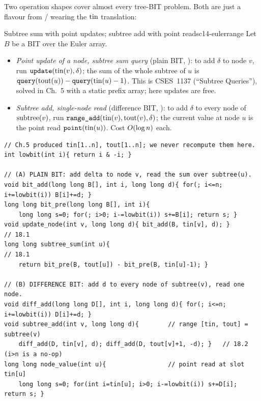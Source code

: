 Two operation shapes cover almost every tree-BIT problem.  Both are just a
flavour from / wearing the \(\operatorname{tin}\)
translation:

\begin{proposition}{Subtree sum with point updates; subtree add with point reads}{c14-eulerrange}
Let \(B\) be a BIT over the Euler array.
\begin{itemize}[nosep,leftmargin=1.4em]
  \item \emph{Point update of a node, subtree sum query} (plain BIT,
        ): to add \(\delta\) to node \(v\), run
        \(\texttt{update}(\operatorname{tin}(v),\delta)\); the sum of the whole subtree of
        \(u\) is \(\texttt{query}(\operatorname{tout}(u))-\texttt{query}(\operatorname{tin}(u)-1)\).
        This is CSES~1137 (``Subtree Queries''), solved in Ch.~5 with a static
        prefix array; here updates are free.
  \item \emph{Subtree add, single-node read} (difference BIT,
        ): to add \(\delta\) to every node of
        \(\operatorname{subtree}(v)\), run \(\texttt{range\_add}(\operatorname{tin}(v),\operatorname{tout}(v),\delta)\);
        the current value at node \(u\) is the point read
        \(\texttt{point}(\operatorname{tin}(u))\).  Cost \(O(\log n)\) each.
\end{itemize}
\end{proposition}

\begin{lstlisting}[caption={Euler-indexed BIT: subtree sum with point updates, and subtree add with point reads}, label={lst:c14-subtree}]
// Ch.5 produced tin[1..n], tout[1..n]; we never recompute them here.
int lowbit(int i){ return i & -i; }

// (A) PLAIN BIT: add delta to node v, read the sum over subtree(u).
void bit_add(long long B[], int i, long long d){ for(; i<=n; i+=lowbit(i)) B[i]+=d; }
long long bit_pre(long long B[], int i){
    long long s=0; for(; i>0; i-=lowbit(i)) s+=B[i]; return s; }
void update_node(int v, long long d){ bit_add(B, tin[v], d); }          // 18.1
long long subtree_sum(int u){                                          // 18.1
    return bit_pre(B, tout[u]) - bit_pre(B, tin[u]-1); }

// (B) DIFFERENCE BIT: add d to every node of subtree(v), read one node.
void diff_add(long long D[], int i, long long d){ for(; i<=n; i+=lowbit(i)) D[i]+=d; }
void subtree_add(int v, long long d){        // range [tin, tout] = subtree(v)
    diff_add(D, tin[v], d); diff_add(D, tout[v]+1, -d); }   // 18.2 (i>n is a no-op)
long long node_value(int u){                 // point read at slot tin[u]
    long long s=0; for(int i=tin[u]; i>0; i-=lowbit(i)) s+=D[i]; return s; }
\end{lstlisting}

